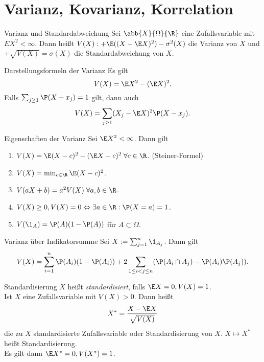\section*{Varianz, Kovarianz, Korrelation}

\begin{karte}{Varianz und Standardabweichung}
    Sei \( \abb{X}{\Omega}{\R} \) eine Zufallsvariable mit 
    \( E X^2 < \infty \). 
    Dann heißt \( V(X) :+ \E((X - \E X)^2) - \sigma^2(X) \) 
    die Varianz von \(X\) und \( +\sqrt{V(X)} = \sigma(X) \)
    die Standardabweichung von \(X\).
\end{karte}

\begin{karte}{Darstellungsformeln der Varianz}
    Es gilt 
    \[ V(X) = \E X^2 - (\E X)^2. \]
    Falls \( \sum_{j\geq 1} \P(X - x_j) = 1 \) gilt, dann auch 
    \[ V(X) = \sum_{j\geq 1} (X_j - \E X)^2 \P(X - x_j). \]
\end{karte}

\begin{karte}{Eigenschaften der Varianz}
    Sei \( \E X^2 < \infty \). Dann gilt 
    \begin{enumerate}
        \item \( V(X) = \E(X - c)^2 - (\E X - c)^2 \; \forall c \in \R \). (Steiner-Formel)
        \item \( V(X) = \min_{c\in \R} \E(X - c)^2 \).
        \item \( V(aX + b) = a^2 V(X) \;\forall a,b\in \R \).
        \item \( V(X) \geq 0, V(X) = 0 \Leftrightarrow \exists a \in \R: \P(X = a) = 1 \).
        \item \( V(\1_A) = \P(A)(1 - \P(A)) \) für \(A \subset \Omega\).
    \end{enumerate}
\end{karte}

\begin{karte}{Varianz über Indikatorsumme}
    Sei \( X := \sum_{j=1}^n \1_{A_j} \). Dann gilt 
    \[ V(X) = \sum_{i=1}^n \P(A_i)(1-\P(A_i)) 
    + 2 \sum_{1 \leq i < j \leq n} (\P(A_i \cap A_j) - \P(A_i)\P(A_j)). \]
\end{karte}

\begin{karte}{Standardisierung}
    \( X \) heißt \textit{standardisiert}, falls \( \E X = 0, V(X) = 1 \).\\
    Ist \( X \) eine Zufallsvariable mit \( V(X) > 0 \). Dann heißt  
    \[ X^* = \frac{ X - \E X }{\sqrt{V(X)}} \]
    die zu \( X \) standardisierte Zufallsvariable oder Standardisierung von \(X\).
    \( X \mapsto X^* \) heißt Standardisierung.\\
    Es gilt dann \( \E X^* = 0, V(X^*) = 1 \).
\end{karte}

